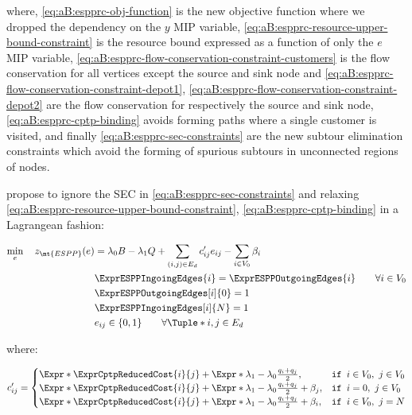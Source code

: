 where, \eqref{eq:aB:espprc-obj-function} is the new objective function where we dropped the dependency on the $y$ MIP variable,
\eqref{eq:aB:espprc-resource-upper-bound-constraint} is the resource bound expressed as a function of only the $e$ MIP variable,
\eqref{eq:aB:espprc-flow-conservation-constraint-customers} is the flow conservation for all vertices except the source and sink node
and \eqref{eq:aB:espprc-flow-conservation-constraint-depot1}, \eqref{eq:aB:espprc-flow-conservation-constraint-depot2} are the flow conservation for respectively the source and sink node,
\eqref{eq:aB:espprc-cptp-binding} avoids forming paths where a single customer is visited,
and finally \eqref{eq:aB:espprc-sec-constraints} are the new subtour elimination constraints which avoid the forming of spurious subtours in unconnected regions of nodes.

\cite{beasley1989algorithm} propose to ignore the SEC in \eqref{eq:aB:espprc-sec-constraints} and relaxing \eqref{eq:aB:espprc-resource-upper-bound-constraint}, \eqref{eq:aB:espprc-cptp-binding} in a Lagrangean fashion:

\begin{align}
	\min_{e} \quad z_\mt{ESPP}(e) & = \lambda_0 B - \lambda_1 Q + \sum_{(i, j) \in E_d}  c'_{ij} e_{ij} - \sum_{i \in V_0} \beta_i  \label{eq:aB:esp-relaxed-obj-function} \\
	                              & \ExprESPPIngoingEdges{i} = \ExprESPPOutgoingEdges{i}        \qquad \forall i \in V_0                                                   \\
	                              & \ExprESPPOutgoingEdges[i]{0} = 1                                                                                                       \\
	                              & \ExprESPPIngoingEdges[i]{N} = 1                                                                                                        \\
	                              & e_{ij}                   \in \lbrace 0, 1 \rbrace           \qquad \forall \Tuple*{i, j} \in E_d
\end{align}

where:

\begin{equation}
	c'_{ij} =
	\begin{cases}
		\Expr*{\ExprCptpReducedCost{i}{j}} + \Expr*{\lambda_1 - \lambda_0} \frac{q_i + q_j}{2},           & \texttt{if } i \in V_0,\ j \in V_0 \\
		\Expr*{\ExprCptpReducedCost{i}{j}} + \Expr*{\lambda_1 - \lambda_0} \frac{q_i + q_j}{2} + \beta_j, & \texttt{if } i = 0,\ j \in V_0     \\
		\Expr*{\ExprCptpReducedCost{i}{j}} + \Expr*{\lambda_1 - \lambda_0} \frac{q_i + q_j}{2} + \beta_i, & \texttt{if } i \in V_0,\ j = N
	\end{cases}
\end{equation}

